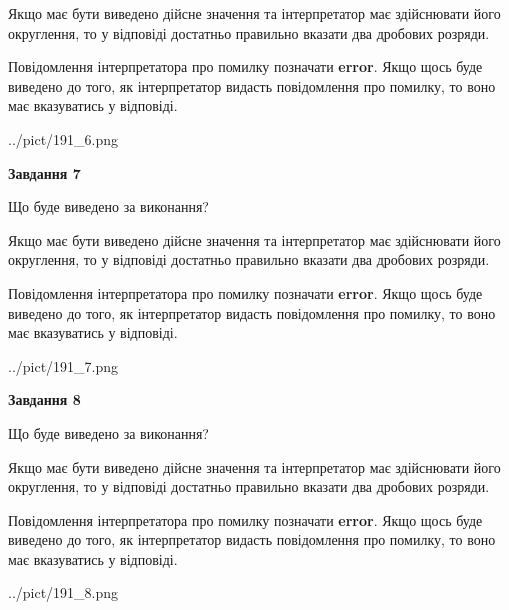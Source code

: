 \documentclass[12pt, ukrainian]{article}
\begin{document}
{\begin {Large}
Якщо має бути виведено дійсне значення та інтерпретатор має здійснювати його округлення, 
то у відповіді достатньо правильно вказати два дробових розряди.

Повідомлення інтерпретатора про помилку позначати \textbf{error}.
Якщо щось буде виведено до того, як інтерпретатор видасть повідомлення про помилку, 
то воно має вказуватись у відповіді. \par

\begin{center}
	{../pict/191_6.png}
\end{center}
\newpage

{\begin {center}\textbf{Завдання 7}\end {center}}\par
Що буде виведено за виконання? \par

Якщо має бути виведено дійсне значення та інтерпретатор має здійснювати його округлення, 
то у відповіді достатньо правильно вказати два дробових розряди.

Повідомлення інтерпретатора про помилку позначати \textbf{error}.
Якщо щось буде виведено до того, як інтерпретатор видасть повідомлення про помилку, 
то воно має вказуватись у відповіді. \par

\begin{center}
	{../pict/191_7.png}
\end{center}
\newpage

{\begin {center}\textbf{Завдання 8}\end {center}}\par
Що буде виведено за виконання? \par

Якщо має бути виведено дійсне значення та інтерпретатор має здійснювати його округлення, 
то у відповіді достатньо правильно вказати два дробових розряди.

Повідомлення інтерпретатора про помилку позначати \textbf{error}.
Якщо щось буде виведено до того, як інтерпретатор видасть повідомлення про помилку, 
то воно має вказуватись у відповіді. \par

\begin{center}
	{../pict/191_8.png}
\end{center}
\newpage


\end{Large}}
\end{document}
